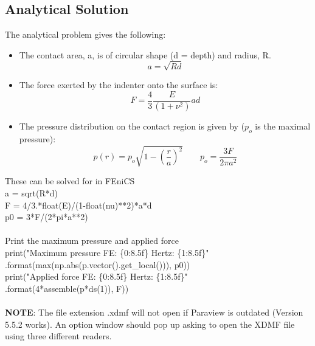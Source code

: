 \documentclass[12pt,3p]{article}
\begin{document}
\subsection{Analytical Solution}
The analytical problem gives the following: 
\begin{itemize}
\item The contact area, a, is of circular shape (d = depth) and radius, R.
	\begin{equation*}
	a = \sqrt{Rd}
	\end{equation*}
\item The force exerted by the indenter onto the surface is:
	\begin{equation*}
	F = \frac{4}{3} \frac{E}{(1+ \nu^2)} ad
	\end{equation*}
\item The pressure distribution on the contact region is given by ($p_o$ is the maximal pressure):
	\begin{equation*}
	p(r) = p_o \sqrt{1 - (\frac{r}{a})^2} \quad \quad p_o = \frac{3F}{2 \pi a^2}
	\end{equation*}
\end{itemize}
These can be solved for in FEniCS \\
{\selectfont
a = sqrt(R*d) \\
F = 4/3.*float(E)/(1-float(nu)**2)*a*d \\
p0 = 3*F/(2*pi*a**2) \\ \\
}
Print the maximum pressure and applied force \\
{\selectfont
print("Maximum pressure FE: \{0:8.5f\} Hertz: \{1:8.5f\}" \\
\indent \indent.format(max(np.abs(p.vector().get\_local())), p0)) \\
print("Applied force FE: \{0:8.5f\} Hertz: \{1:8.5f\}" \\
\indent \indent .format(4*assemble(p*ds(1)), F)) \\ \\
}
\textbf{NOTE}: The file extension .xdmf will not open if Paraview is outdated (Version 5.5.2 works). An option window should pop up asking to open the XDMF file using three different readers. \\ \\
\end{document}
